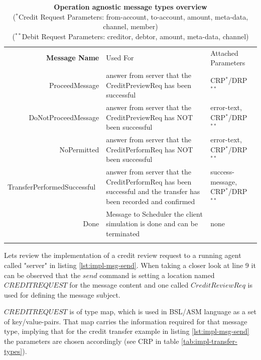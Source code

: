 \begin{table}[H]
\begin{centering}
\small
{
\begin{tabular}{ r | p{7cm} | p{3.1cm} }
\hline
\textbf{Message Name} & Used For & Attached Parameters \\
\Xhline{1.5pt}

ProceedMessage & answer from server that the CreditPreviewReq has been successful & CRP$^{*}$/DRP$^{**}$\\[3pt]
\hline
DoNotProceedMessage & answer from server that the CreditPreviewReq has NOT  been successful & error-text, CRP$^{*}$/DRP$^{**}$\\[3pt]
\hline
NoPermitted & answer from server that the CreditPerformReq has NOT  been successful & error-text, CRP$^{*}$/DRP$^{**}$ \\[3pt]
\hline
TransferPerformedSuccessful\ & answer from server that the CreditPerformReq has been successful and the transfer has been recorded and confirmed & success-message, CRP$^{*}$/DRP$^{**}$ \\[3pt]
\hline
Done & Message to Scheduler the client simulation is done and can be terminated & none \\[3pt]

\Xhline{1.5pt}
\end{tabular}
}
\caption{\small\textbf{Operation agnostic message types overview}\\
($^{*}$Credit Request Parameters: from-account, to-account, amount, meta-data, channel, member)\\
($^{**}$Debit Request Parameters:  creditor, debtor, amount, meta-data, channel)}
\label{tab:impl-msg-generic-types}
\end{centering}
\vspace{-0.5cm}
\end{table}

Lets review the implementation of a credit review request to a running agent called "server" in listing \ref{lst:impl-msg-send}. When taking a closer look at line 9 it can be observed that the $send$ command is setting a location named $CREDITREQUEST$ for the message content and one called $CreditReviewReq$ is used for defining the message subject.

$CREDITREQUEST$ is of type map, which is used in BSL/ASM language as a set of key/value-pairs. That map carries the information required for that message type, implying that for the credit transfer example in listing \ref{lst:impl-msg-send} the parameters are chosen accordingly (see CRP in table \ref{tab:impl-transfer-types}).

